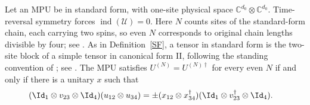 \begin{lemma}
    \label{PropChiral}
    \leanok
    Let an MPU be in standard form, with one-site physical space
    $\mathbb C^{d_0}\otimes\mathbb C^{d_0}$. Time-reversal symmetry forces
    $\operatorname{ind}(\mathcal U)=0$. Here $N$ counts sites of the
    standard-form chain, each carrying two spins, so even $N$ corresponds to
    original chain lengths divisible by four; see
    \cite{gap:mpu_standard_form_parity_gap}. As in Definition~\ref{SF}, a
    tensor in standard form is the two-site block of a simple tensor in
    canonical form II, following the standing convention of
    \cite[line~326]{Cirac2017MPU}; see
    \cite{gap:mpu_standard_form_canonical_convention}. The MPU satisfies
    $U^{(N)}=U^{(N)\dagger}$ for every even $N$ if and only if there is a
    unitary $x$ such that
    \begin{align}
        (\Id_1\otimes v_{23}\otimes\Id_4)(u_{12}\otimes u_{34})
         & =\pm(x_{12}\otimes x_{34}^\dagger)
        (\Id_1\otimes v_{23}^\dagger\otimes\Id_4).
    \end{align}
\end{lemma}


